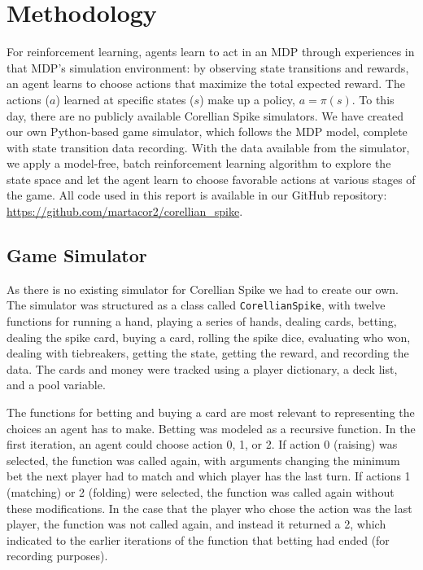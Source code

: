 \documentclass{article}
\begin{document}
\section{Methodology}
For reinforcement learning, agents learn to act in an MDP through experiences in that MDP's simulation environment: by observing state transitions and rewards, an agent learns to choose actions that maximize the total expected reward. The actions ($a$) learned at specific states ($s$) make up a policy, $a = \pi(s)$. To this day, there are no publicly available Corellian Spike simulators. We have created our own Python-based game simulator, which follows the MDP model, complete with state transition data recording. With the data available from the simulator, we apply a model-free, batch reinforcement learning algorithm to explore the state space and let the agent learn to choose favorable actions at various stages of the game. All code used in this report is available in our GitHub repository: \href{https://github.com/martacor2/corellian\_spike}{https://github.com/martacor2/corellian\_spike}.
\subsection{Game Simulator} %
As there is no existing simulator for Corellian Spike we had to create our own. The simulator was structured as a class called \texttt{CorellianSpike}, with twelve functions for running a hand, playing a series of hands, dealing cards, betting, dealing the spike card, buying a card, rolling the spike dice, evaluating who won, dealing with tiebreakers, getting the state, getting the reward, and recording the data. The cards and money were tracked using a player dictionary, a deck list, and a pool variable.

The functions for betting and buying a card are most relevant to representing the choices an agent has to make. Betting was modeled as a recursive function. In the first iteration, an agent could choose action 0, 1, or 2. If action 0 (raising) was selected, the function was called again, with arguments changing the minimum bet the next player had to match and which player has the last turn. If actions 1 (matching) or 2 (folding) were selected, the function was called again without these modifications. In the case that the player who chose the action was the last player, the function was not called again, and instead it returned a 2, which indicated to the earlier iterations of the function that betting had ended (for recording purposes).
\end{document}
